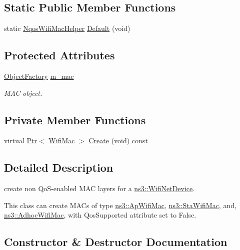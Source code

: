 \subsection*{Static Public Member Functions}
\begin{DoxyCompactItemize}
\item 
static \hyperlink{classns3_1_1NqosWifiMacHelper}{Nqos\+Wifi\+Mac\+Helper} \hyperlink{classns3_1_1NqosWifiMacHelper_acc475fe82a0be74feae1a2be3d07ac00}{Default} (void)
\end{DoxyCompactItemize}
\subsection*{Protected Attributes}
\begin{DoxyCompactItemize}
\item 
\hyperlink{classns3_1_1ObjectFactory}{Object\+Factory} \hyperlink{classns3_1_1NqosWifiMacHelper_ae4437169b30d744eaa8ebda79a66ec59}{m\+\_\+mac}
\begin{DoxyCompactList}\small\item\em M\+AC object. \end{DoxyCompactList}\end{DoxyCompactItemize}
\subsection*{Private Member Functions}
\begin{DoxyCompactItemize}
\item 
virtual \hyperlink{classns3_1_1Ptr}{Ptr}$<$ \hyperlink{classns3_1_1WifiMac}{Wifi\+Mac} $>$ \hyperlink{classns3_1_1NqosWifiMacHelper_abe660ed397ecf9c4d2ff4ca3ce3990e4}{Create} (void) const 
\end{DoxyCompactItemize}


\subsection{Detailed Description}
create non Qo\+S-\/enabled M\+AC layers for a \hyperlink{classns3_1_1WifiNetDevice}{ns3\+::\+Wifi\+Net\+Device}. 

This class can create M\+A\+Cs of type \hyperlink{classns3_1_1ApWifiMac}{ns3\+::\+Ap\+Wifi\+Mac}, \hyperlink{classns3_1_1StaWifiMac}{ns3\+::\+Sta\+Wifi\+Mac}, and, \hyperlink{classns3_1_1AdhocWifiMac}{ns3\+::\+Adhoc\+Wifi\+Mac}, with Qos\+Supported attribute set to False. 

\subsection{Constructor \& Destructor Documentation}
